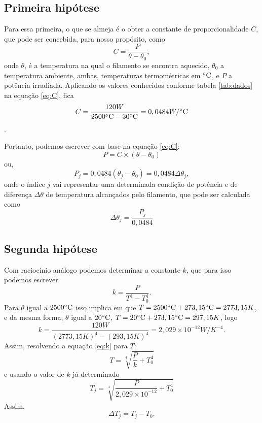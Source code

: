 \documentclass[12pt]{article}
\begin{document}
\subsection{Primeira hipótese}
Para essa primeira, o que se almeja é o obter a constante de proporcionalidade $C$, que pode ser concebida, para nosso propósito, como
\begin{equation}
     C=\frac{P}{\theta-\theta_0},
     \label{eq:C}
\end{equation}
onde $\theta$, é a temperatura na qual o filamento se encontra aquecido, $\theta_0$ a temperatura ambiente, ambas, temperaturas termométricas em $\celsius$, e $P$ a potência irradiada.
Aplicando os valores conhecidos conforme tabela \ref{tab:dados} na equação \ref{eq:C}, fica
\begin{equation}
    C=\frac{120W}{2500\celsius-30\celsius}=0,0484W/\celsius
\end{equation}.

Portanto, podemos escrever com base na equação \ref{eq:C}:
\begin{equation}
    P=C\times(\theta-\theta_0)
\end{equation}
ou,
\begin{equation}
    P_j=0,0484(\theta_j-\theta_0)=0,0484\Delta\theta_j,
    \label{eq:P(teta)}
\end{equation}
onde o índice $j$ vai representar uma determinada condição de potência e de diferença $\Delta\theta$ de temperatura alcançados pelo filamento, que pode ser calculada como
\begin{equation}
   \Delta\theta_j=\frac{P_j}{0,0484}
    \label{eq:P(Deltatheta)}
\end{equation}
\subsection{Segunda hipótese}
Com raciocínio análogo podemos determinar a constante $k$, que para isso podemos escrever
\begin{equation}
    k=\frac{P}{T^4-T^{4}_0}.
    \label{eq:k}
\end{equation}Para $\theta$ igual a $2500\celsius$ isso implica em que $T=2500\celsius+273,15\celsius=2773,15K$,
 e da mesma forma, $\theta$ igual a $20\celsius$,  $T=20\celsius+273,15\celsius=297,15K$, logo
\begin{equation}
     k=\frac{120W}{(2773,15K)^4-(293,15K)^4}=2,029\times10^{-12}W/K^{-4}.
\end{equation}
Assim, resolvendo a equação \ref{eq:k} para $T$:
\begin{equation}
    T=\sqrt[4]{\frac{P}{k}+T^{4}_0}
\end{equation}
e usando o valor de $k$ já determinado
\begin{equation}
    T_j=\sqrt[4]{\frac{P}{2,029\times10^{-12}}+T^{4}_0}
    \label{eq:T_j}
\end{equation}
Assim,
\begin{equation}
    \Delta T_j=T_j-T_0.
    \label{eq:deltaT}
\end{equation}
\end{document}
